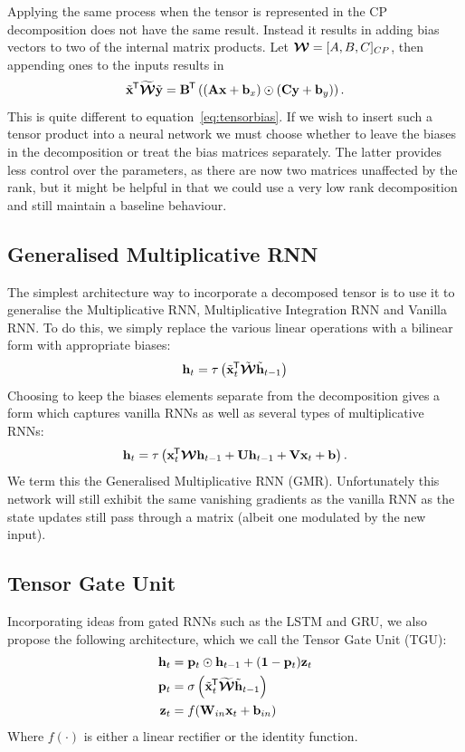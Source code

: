 Applying the same process when the tensor is represented in the CP decomposition does not
have the same result. Instead it results in adding bias vectors to two of the internal
matrix products. Let \(\bm{\mathcal{W}} = [A, B, C]_{CP}\), then appending ones to the inputs
results in
\begin{equation}
	\tilde{\mathbf{x}}^{\mkern-1.5mu\mathsf{T}}\widetilde{\bm{\mathcal{W}}}\tilde{\mathbf{y}}
	= \mathbf{B}^{\mkern-1.5mu\mathsf{T}}\left( (\mathbf{A}\mathbf{x} + \mathbf{b}_x) \odot (\mathbf{C}\mathbf{y} + \mathbf{b}_y)\right).
\end{equation} This is quite different to equation~\eqref{eq:tensorbias}. If we wish to
insert such a tensor product into a neural network we must choose whether to leave the biases in
the decomposition or treat the bias matrices separately. The latter provides less control over the
parameters, as there are now two matrices unaffected by the rank, but it might be helpful in that we
could use a very low rank decomposition and still maintain a baseline behaviour.

\subsection{Generalised Multiplicative RNN}\label{sec:gmrnn}
The simplest architecture way to incorporate a decomposed tensor is to use it to generalise the
Multiplicative RNN, Multiplicative Integration RNN \autocite{Martens2011a, Wu2016} and Vanilla RNN.
To do this, we simply replace the various linear operations with a bilinear form with appropriate
biases:
\begin{equation}\label{eq:gmrnn}
	\mathbf{h}_t = \tau\left( \tilde{\mathbf{x}}_t^{\mkern-1.5mu\mathsf{T}}\tilde{\bm{\mathcal{W}}}\tilde{\mathbf{h}}_{t-1} \right)
\end{equation}
Choosing to keep the biases elements separate from the decomposition gives a form which captures
vanilla RNNs as well as several types of multiplicative RNNs:
\begin{equation}\label{eq:gmrnnbias}
	\mathbf{h}_t = \tau\left(\mathbf{x}_t^{\mkern-1.5mu\mathsf{T}}\bm{\mathcal{W}}\mathbf{h}_{t-1}
		+ \mathbf{U}\mathbf{h}_{t-1} + \mathbf{V}\mathbf{x}_t + \mathbf{b}\right).
\end{equation} We term this the Generalised Multiplicative RNN (GMR). Unfortunately this
network will still exhibit the same vanishing gradients as the vanilla RNN as the state updates
still pass through a matrix (albeit one modulated by the new input).

\subsection{Tensor Gate Unit}
Incorporating ideas from gated RNNs such as the LSTM and GRU, we also propose the following architecture,
which we call the Tensor Gate Unit (TGU):
\begin{align}\label{eq:tgu}
	\mathbf{h}_t &= \mathbf{p}_t \odot \mathbf{h}_{t-1} + (\mathbf{1}-\mathbf{p}_t)\mathbf{z}_t \\
	\mathbf{p}_t &= \sigma\left(\tilde{\mathbf{x}}^{\mkern-1.5mu\mathsf{T}}_t\widetilde{\bm{\mathcal{W}}}\tilde{\mathbf{h}}_{t-1} \right)\\
	\mathbf{z}_t &= f(\mathbf{W}_{in}\mathbf{x}_t + \mathbf{b}_{in})
\end{align}
Where \(f(\cdot)\) is either a linear rectifier or the identity function.

